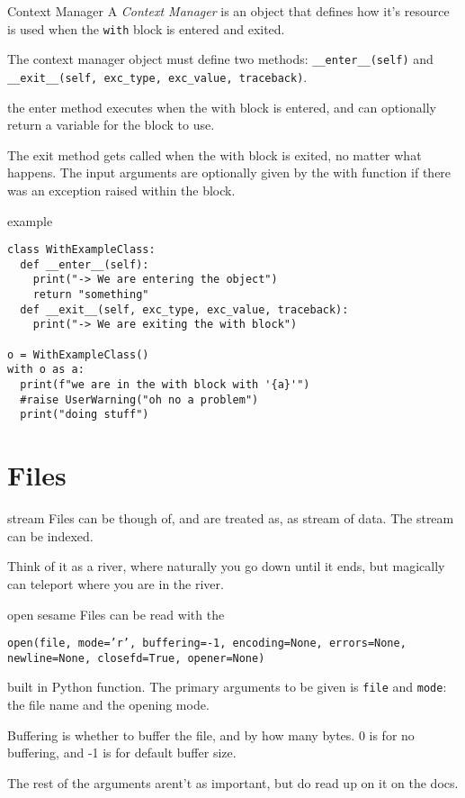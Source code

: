 \begin{frame}[containsverbatim]{Context Manager}
  A \textit{Context Manager} is an object that defines how it's resource is used when the \verb|with| block is entered and exited.

  The context manager object must define two methods: \verb|__enter__(self)| and \verb|__exit__(self, exc_type, exc_value, traceback)|.

  the enter method executes when the with block is entered, and can optionally return a variable for the block to use.

  The exit method gets called when the with block is exited, no matter what happens. The input arguments are optionally given by the with function if there was an exception raised within the block.
\end{frame}

\begin{frame}[containsverbatim]{example}
\begin{verbatim}
class WithExampleClass:
  def __enter__(self):
    print("-> We are entering the object")
    return "something"
  def __exit__(self, exc_type, exc_value, traceback):
    print("-> We are exiting the with block")

o = WithExampleClass()
with o as a:
  print(f"we are in the with block with '{a}'")
  #raise UserWarning("oh no a problem")
  print("doing stuff")
\end{verbatim}
\end{frame}

\section{Files}

\begin{frame}[containsverbatim]{stream}
  Files can be though of, and are treated as, as stream of data.
  The stream can be indexed.

  Think of it as a river, where naturally you go down until it ends, but magically can teleport where you are in the river.
\end{frame}

\begin{frame}[containsverbatim]{open sesame}
  Files can be read with the

  \texttt{open(file, mode='r', buffering=-1, encoding=None, errors=None, newline=None, closefd=True, opener=None)}

  built in Python function. The primary arguments to be given is \verb|file| and \verb|mode|: the file name and the opening mode.

  Buffering is whether to buffer the file, and by how many bytes. 0 is for no buffering, and -1 is for default buffer size.

  The rest of the arguments arent't as important, but do read up on it on the docs.
\end{frame}

